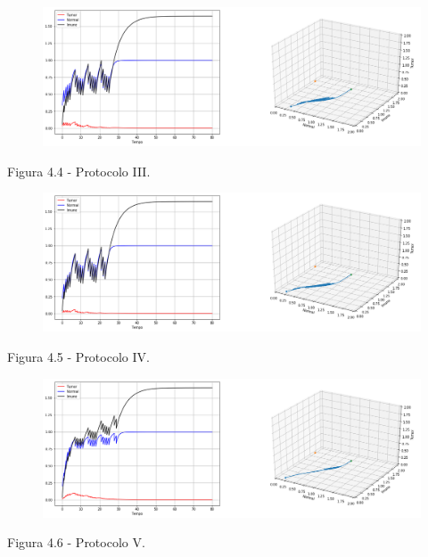 \documentclass[12pt, a4paper]{article}
\begin{document}
\begin{center}
\begin{figure}[!h]
	\centering
    \includegraphics[scale=0.4]{imgs/plot_trat_3.png}

  \end{figure}


Figura 4.4 - Protocolo III.
\end{center}

\newpage

\begin{center}
\begin{figure}[!h]
	\centering
    \includegraphics[scale=0.4]{imgs/plot_trat_4.png}

  \end{figure}


Figura 4.5 - Protocolo IV.
\end{center}

\begin{center}
\begin{figure}[!h]
	\centering
    \includegraphics[scale=0.4]{imgs/plot_trat_5.png}

  \end{figure}


Figura 4.6 - Protocolo V.
\end{center}
\end{document}
